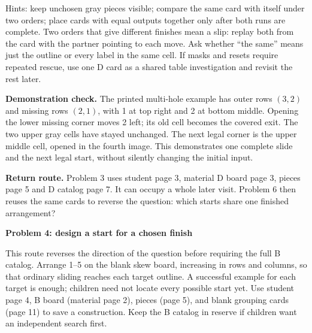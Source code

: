 \documentclass[11pt]{article}
\newcommand{\heading}[1]{\par\textbf{#1}\par}
\begin{document}
Hints: keep unchosen gray pieces visible; compare the same card with itself under two orders; place cards with equal outputs together only after both runs are complete. Two orders that give different finishes mean a slip: replay both from the card with the partner pointing to each move. Ask whether ``the same'' means just the outline or every label in the same cell. If masks and resets require repeated rescue, use one D card as a shared table investigation and revisit the rest later.

\textbf{Demonstration check.} The printed multi-hole example has outer rows $(3,2)$ and missing rows $(2,1)$, with 1 at top right and 2 at bottom middle. Opening the lower missing corner moves 2 left; its old cell becomes the covered exit. The two upper gray cells have stayed unchanged. The next legal corner is the upper middle cell, opened in the fourth image. This demonstrates one complete slide and the next legal start, without silently changing the initial input.

\textbf{Return route.} Problem 3 uses student page 3, material D board page 3, pieces page 5 and D catalog page 7. It can occupy a whole later visit. Problem 6 then reuses the same cards to reverse the question: which starts share one finished arrangement?
\newpage
\heading{Problem 4: design a start for a chosen finish}
This route reverses the direction of the question before requiring the full B catalog. Arrange 1--5 on the blank skew board, increasing in rows and columns, so that ordinary sliding reaches each target outline. A successful example for each target is enough; children need not locate every possible start yet. Use student page 4, B board (material page 2), pieces (page 5), and blank grouping cards (page 11) to save a construction. Keep the B catalog in reserve if children want an independent search first.
\end{document}
